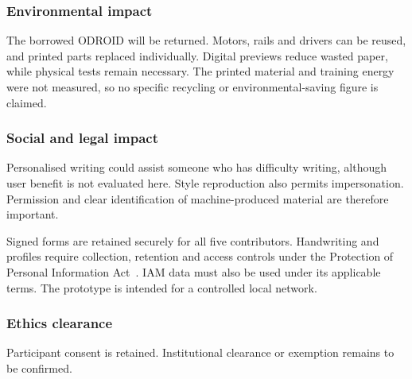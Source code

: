 \subsubsection{Environmental impact}
The borrowed ODROID will be returned. Motors, rails and drivers can be reused, and printed parts replaced individually. Digital previews reduce wasted paper, while physical tests remain necessary. The printed material and training energy were not measured, so no specific recycling or environmental-saving figure is claimed.

\subsubsection{Social and legal impact}
Personalised writing could assist someone who has difficulty writing, although user benefit is not evaluated here. Style reproduction also permits impersonation. Permission and clear identification of machine-produced material are therefore important.

Signed forms are retained securely for all five contributors. Handwriting and profiles require collection, retention and access controls under the Protection of Personal Information Act~\cite[pp.~8--9, 11]{popia2013}. IAM data must also be used under its applicable terms. The prototype is intended for a controlled local network.

\subsubsection{Ethics clearance}
Participant consent is retained. Institutional clearance or exemption remains to be confirmed.

\FloatBarrier
